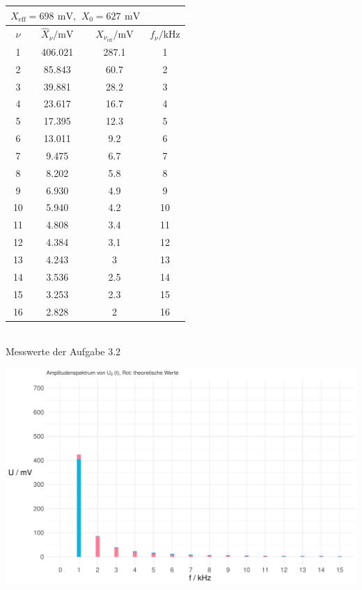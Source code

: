 \documentclass[a4paper, 12pt]{article}
\begin{document}
  \subsection{}
  \begin{center}
    \bgroup
    \def\arraystretch{1.6180339887498948}
      \begin{tabular}{@{}cccc@{}}
      \toprule
      \multicolumn{3}{c}{$X_{\text{eff}}=698
      \,\ \si{\milli\volt}, \,\ X_0 = 627 \,\ \si{\milli\volt}$} \\ \midrule
      $\nu$      & $\hat{X}_\nu / \si{\milli\volt}$   & $X_{\nu_{\text{eff}}} / \si{\milli\volt}$ & $f_\nu / \si{\kilo\hertz}$ \\ \hline
        1  & 406.021 & 287.1 & 1        \\
        2  & 85.843  & 60.7  & 2        \\
        3  & 39.881  & 28.2  & 3        \\
        4  & 23.617  & 16.7  & 4        \\
        5  & 17.395  & 12.3  & 5        \\
        6  & 13.011  & 9.2   & 6        \\
        7  & 9.475   & 6.7   & 7        \\
        8  & 8.202   & 5.8   & 8        \\
        9  & 6.930   & 4.9   & 9        \\
        10 & 5.940   & 4.2   & 10       \\
        11 & 4.808   & 3.4   & 11       \\
        12 & 4.384   & 3.1   & 12       \\
        13 & 4.243   & 3     & 13       \\
        14 & 3.536   & 2.5   & 14       \\
        15 & 3.253   & 2.3   & 15       \\
        16 & 2.828   & 2     & 16       \\ \bottomrule
      \end{tabular}\\
      Messwerte der Aufgabe 3.2\\
      \egroup
    \end{center}

    \begin{center}
      \includegraphics[scale=0.5]{./R/3_2/3_2_ASpektrum.pdf}
    \end{center}
\end{document}

